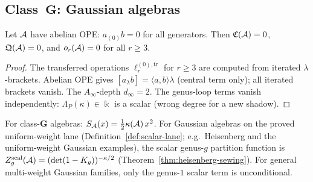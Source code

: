 
\subsection{Class~$\mathbf{G}$: Gaussian algebras}
\label{subsec:thqg-gaussian}

\begin{theorem}
\label{thm:thqg-gaussian-termination}
\ClaimStatusProvedHere
{}
Let $\mathcal{A}$ have abelian OPE: $a_{(0)}b = 0$ for all generators.
Then $\mathfrak{C}(\mathcal{A}) = 0$, $\mathfrak{Q}(\mathcal{A}) = 0$, and
$o_r(\mathcal{A}) = 0$ for all $r \geq 3$.
\end{theorem}

\begin{proof}
The transferred operations $\ell_r^{(0),\mathrm{tr}}$ for
$r \geq 3$ are computed from iterated $\lambda$-brackets.
Abelian OPE gives $[a_\lambda b] = \langle a,b\rangle\lambda$
(central term only); all iterated brackets vanish.
The $A_\infty$-depth $d_\infty = 2$.
The genus-loop terms vanish independently:
$\Lambda_P(\kappa) \in \Bbbk$ is a scalar (wrong
degree for a new shadow).
\end{proof}

\begin{corollary}
\label{cor:thqg-gaussian-potential}
\ClaimStatusProvedHere
For class-$\mathbf{G}$ algebras:
$S_{\mathcal{A}}(x) = \frac{1}{2}\kappa(\mathcal{A})\,x^2$.
For Gaussian algebras on the proved uniform-weight lane
(Definition~\ref{def:scalar-lane};
e.g.\ Heisenberg and the uniform-weight Gaussian examples), the scalar genus-$g$ partition function is
$Z_g^{\mathrm{scal}}(\mathcal{A}) = (\det(1 - K_g))^{-\kappa/2}$
\textup{(}Theorem~\ref{thm:heisenberg-sewing}\textup{)}.
For general multi-weight Gaussian families, only the genus-$1$
scalar term is unconditional.
\end{corollary}

